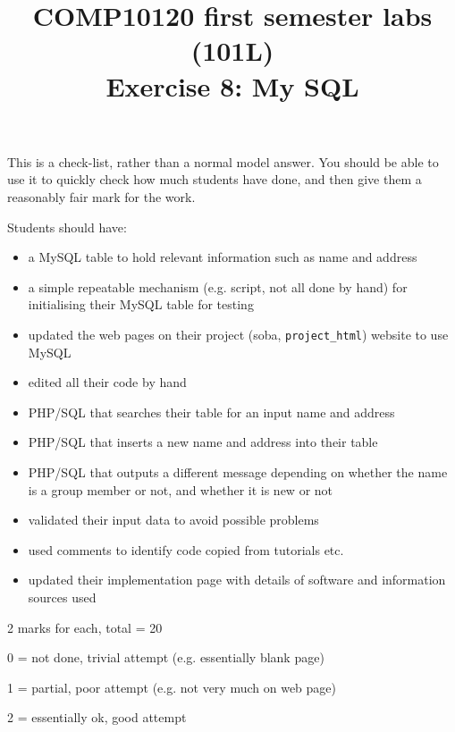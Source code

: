 \documentclass[12pt]{article}
\title{COMP10120 first semester labs (101L) \\
       Exercise 8: My SQL}
\author{}
\date{}
\begin{document}
\maketitle

This is a check-list, rather than a normal model answer. You should
be able to use it to quickly check how much students have done, and
then give them a reasonably fair mark for the work.

Students should have:

\begin{itemize}


\item a MySQL table to hold relevant information such as name and address

\item a simple repeatable mechanism (e.g. script, not all done by hand) for
  initialising their MySQL table for testing

\item updated the web pages on their project (soba, \verb!project_html!) website
  to use MySQL

\item edited all their code by hand

\item PHP/SQL that searches their table for an input name and address

\item PHP/SQL that inserts a new name and address into their table

\item PHP/SQL that outputs a different message depending on whether the name
  is a group member or not, and whether it is new or not

\item validated their input data to avoid possible problems

\item used comments to identify code copied from tutorials etc.

\item updated their implementation page with details of software and
  information sources used

\end{itemize}


2 marks for each, total = 20

 0 = not done, trivial attempt (e.g. essentially blank page)

 1 = partial, poor attempt (e.g. not very much on web page)

 2 = essentially ok, good attempt
\end{document}
